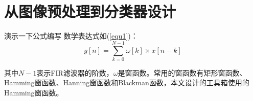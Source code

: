 
\renewcommand{\baselinestretch}{1.345}
\fontsize{12pt}{14.4pt}\selectfont
\chapter{从图像预处理到分类器设计}
演示一下公式编写
数学表达式如(\ref{equ1})：
\begin{equation}
y[n] = \sum_{k =0}^{N-1}\omega[k] \times x[n-k] 
\label{equ1}
\end{equation}

其中$N-1$表示FIR滤波器的阶数，$\omega$是窗函数。常用的窗函数有矩形窗函数、Hamming窗函数、Hanning窗函数和Blackman函数，本文设计的工具箱使用的Hamming窗函数。


\endinput